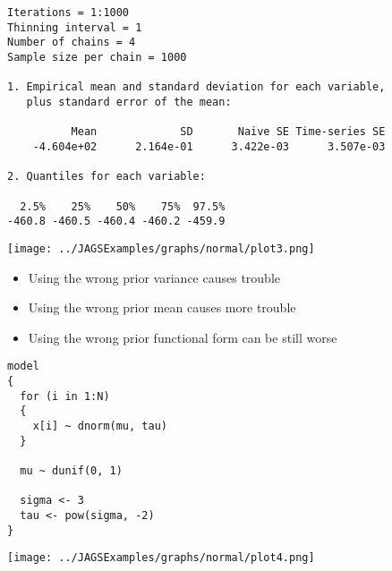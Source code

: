 \documentclass{beamer}
\begin{document}
\begin{frame}[fragile]
  \begin{verbatim}
Iterations = 1:1000
Thinning interval = 1 
Number of chains = 4 
Sample size per chain = 1000 

1. Empirical mean and standard deviation for each variable,
   plus standard error of the mean:

          Mean             SD       Naive SE Time-series SE 
    -4.604e+02      2.164e-01      3.422e-03      3.507e-03 

2. Quantiles for each variable:

  2.5%    25%    50%    75%  97.5% 
-460.8 -460.5 -460.4 -460.2 -459.9 
  \end{verbatim}
\end{frame}

\begin{frame}[fragile]
  \begin{center}
    \texttt{[image: ../JAGSExamples/graphs/normal/plot3.png]}
  \end{center}
\end{frame}

\begin{frame}[fragile]
  \begin{itemize}
    \item{Using the wrong prior variance causes trouble}
    \item{Using the wrong prior mean causes more trouble}
    \item{Using the wrong prior functional form can be still worse}
  \end{itemize}
\end{frame}

\begin{frame}[fragile]
  \begin{verbatim}
model
{
  for (i in 1:N)
  {
    x[i] ~ dnorm(mu, tau)
  }
  
  mu ~ dunif(0, 1)
  
  sigma <- 3
  tau <- pow(sigma, -2)
}
  \end{verbatim}
\end{frame}

\begin{frame}[fragile]
  \begin{center}
    \texttt{[image: ../JAGSExamples/graphs/normal/plot4.png]}
  \end{center}
\end{frame}
\end{document}
